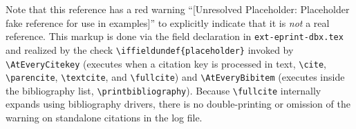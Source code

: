 \documentclass[12pt, twoside]{article}
\newcommand{\fname}[1]{\texttt{#1}}
\begin{document}

\endgroup
\medskip

Note that this reference has a red warning \enquote{[Unresolved Placeholder: Placeholder fake reference for use in examples]} to explicitly indicate that it is \emph{not} a real reference. This markup is done via the field declaration in \fname{ext-eprint-dbx.tex} and realized by the check \texttt{\textbackslash iffieldundef\{placeholder\}} invoked by \texttt{\textbackslash AtEveryCitekey} (executes when a citation key is processed in text, \eg \texttt{\textbackslash cite}, \texttt{\textbackslash parencite}, \texttt{\textbackslash textcite}, and \texttt{\textbackslash fullcite}) and \texttt{\textbackslash AtEveryBibitem} (executes inside the bibliography list, \ie \texttt{\textbackslash printbibliography}). Because \texttt{\textbackslash fullcite} internally expands using bibliography drivers, there is no double-printing or omission of the warning on standalone citations in the log file.
\end{document}
